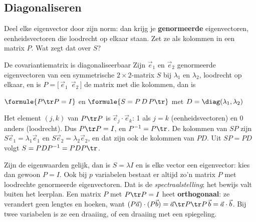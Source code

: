 \begin{oefeningen}
\end{oefeningen}

\subsection{Diagonaliseren}

Deel elke eigenvector door zijn norm: dan krijg je \textbf{genormeerde} eigenvectoren, eenheidsvectoren die loodrecht op elkaar staan. Zet ze als kolommen in een matrix $P$. Wat zegt dat over $S$?

\begin{theorie}
\begin{stelling}{De covariantiematrix is diagonaliseerbaar}
Zijn $\vec e_1$ en $\vec e_2$ genormeerde eigenvectoren van een symmetrische $2 \times 2$-matrix $S$ bij $\lambda_1$ en $\lambda_2$, loodrecht op elkaar, en is $P = \bigl[\,\vec e_1 \ \ \vec e_2\,\bigr]$ de matrix met die kolommen, dan is

\qquad $\formule{P\tr P = I}$ \qquad en \qquad $\formule{S = P\,D\,P\tr}$ \qquad met $D = \diag(\lambda_1, \lambda_2)$
\end{stelling}

\begin{bewijs}
Het element $(j, k)$ van $P\tr P$ is $\vec e_j \cdot \vec e_k$: 1 als $j = k$ (eenheidsvectoren) en 0 anders (loodrecht). Dus $P\tr P = I$, en $P^{-1} = P\tr$. De kolommen van $SP$ zijn $S\vec e_1 = \lambda_1\vec e_1$ en $S\vec e_2 = \lambda_2\vec e_2$, en dat zijn ook de kolommen van $PD$. Uit $SP = PD$ volgt $S = PDP^{-1} = PDP\tr$.
\end{bewijs}
\end{theorie}

Zijn de eigenwaarden gelijk, dan is $S = \lambda I$ en is elke vector een eigenvector: kies dan gewoon $P = I$. Ook bij $p$ variabelen bestaat er altijd zo'n matrix $P$ met loodrechte genormeerde eigenvectoren. Dat is de \textit{spectraalstelling}; het bewijs valt buiten het leerplan. Een matrix $P$ met $P\tr P = I$ heet \textbf{orthogonaal}: ze verandert geen lengtes en hoeken, want $(P\vec a) \cdot (P\vec b) = \vec a\tr P\tr P\,\vec b = \vec a \cdot \vec b$. Bij twee variabelen is ze een draaiing, of een draaiing met een spiegeling.

